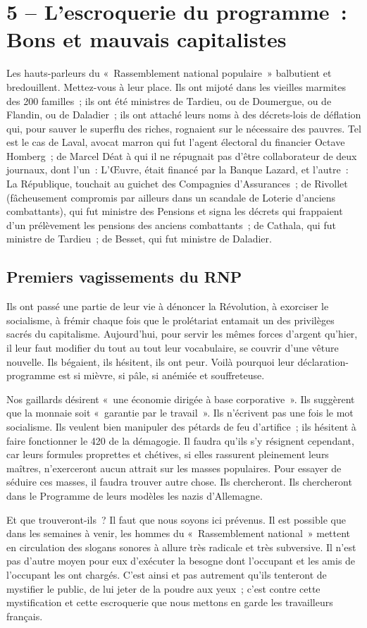\documentclass[french,twoside]{book} %
\begin{document}
\section[5 – L’escroquerie du programme : Bons et mauvais capitalistes]{5 – L’escroquerie du programme : Bons et mauvais capitalistes}
\noindent Les hauts-parleurs du « Rassemblement national populaire » balbutient et bredouillent. Mettez-vous à leur place. Ils ont mijoté dans les vieilles marmites des 200 familles ; ils ont été ministres de Tardieu, ou de Doumergue, ou de Flandin, ou de Daladier ; ils ont attaché leurs noms à des décrets-lois de déflation qui, pour sauver le superflu des riches, rognaient sur le nécessaire des pauvres. Tel est le cas de Laval, avocat marron qui fut l’agent électoral du financier Octave Homberg ; de Marcel Déat à qui il ne répugnait pas d’être collaborateur de deux journaux, dont l’un : L’Œuvre, était financé par la Banque Lazard, et l’autre : La République, touchait au guichet des Compagnies d’Assurances ; de Rivollet (fâcheusement compromis par ailleurs dans un scandale de Loterie d’anciens combattants), qui fut ministre des Pensions et signa les décrets qui frappaient d’un prélèvement les pensions des anciens combattants ; de Cathala, qui fut ministre de Tardieu ; de Besset, qui fut ministre de Daladier.\par
\subsection[Premiers vagissements du RNP]{Premiers vagissements du RNP}
\noindent Ils ont passé une partie de leur vie à dénoncer la Révolution, à exorciser le socialisme, à frémir chaque fois que le prolétariat entamait un des privilèges sacrés du capitalisme. Aujourd’hui, pour servir les mêmes forces d’argent qu’hier, il leur faut modifier du tout au tout leur vocabulaire, se couvrir d’une vêture nouvelle. Ils bégaient, ils hésitent, ils ont peur. Voilà pourquoi leur déclaration-programme est si mièvre, si pâle, si anémiée et souffreteuse.\par
Nos gaillards désirent « une économie dirigée à base corporative ». Ils suggèrent que la monnaie soit « garantie par le travail ». Ils n’écrivent pas une fois le mot socialisme. Ils veulent bien manipuler des pétards de feu d’artifice ; ils hésitent à faire fonctionner le 420 de la démagogie. Il faudra qu’ils s’y résignent cependant, car leurs formules proprettes et chétives, si elles rassurent pleinement leurs maîtres, n’exerceront aucun attrait sur les masses populaires. Pour essayer de séduire ces masses, il faudra trouver autre chose. Ils chercheront. Ils chercheront dans le Programme de leurs modèles les nazis d’Allemagne.\par
Et que trouveront-ils ? Il faut que nous soyons ici prévenus. Il est possible que dans les semaines à venir, les hommes du « Rassemblement national » mettent en circulation des slogans sonores à allure très radicale et très subversive. Il n’est pas d’autre moyen pour eux d’exécuter la besogne dont l’occupant et les amis de l’occupant les ont chargés. C’est ainsi et pas autrement qu’ils tenteront de mystifier le public, de lui jeter de la poudre aux yeux ; c’est contre cette mystification et cette escroquerie que nous mettons en garde les travailleurs français.
\end{document}
